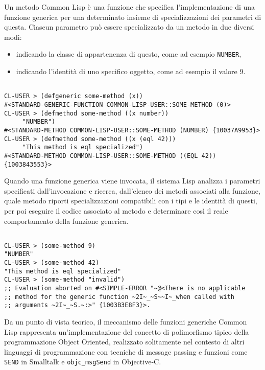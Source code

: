 Un metodo Common Lisp è una funzione che specifica l’implementazione di una
funzione generica per una determinato insieme di specializzazioni dei parametri
di questa. Ciascun parametro può essere specializzato da un metodo in due
diversi modi:

\begin{itemize}

\item indicando la classe di appartenenza di questo, come ad esempio
\texttt{NUMBER},

\item indicando l’identità di uno specifico oggetto, come ad esempio il valore
9.

\end{itemize}

\begin{lstlisting}[caption=Esempi definizione di metodi Common Lisp]

CL-USER > (defgeneric some-method (x))
#<STANDARD-GENERIC-FUNCTION COMMON-LISP-USER::SOME-METHOD (0)>
CL-USER > (defmethod some-method ((x number))
     "NUMBER")
#<STANDARD-METHOD COMMON-LISP-USER::SOME-METHOD (NUMBER) {10037A9953}>
CL-USER > (defmethod some-method ((x (eql 42)))
     "This method is eql specialized")
#<STANDARD-METHOD COMMON-LISP-USER::SOME-METHOD ((EQL 42)) {1003843553}>

\end{lstlisting}

Quando una funzione generica viene invocata, il sistema Lisp analizza i
parametri specificati dall'invocazione e ricerca, dall’elenco dei metodi
associati alla funzione, quale metodo riporti specializzazioni compatibili con i
tipi e le identità di questi, per poi eseguire il codice associato al metodo e
determinare così il reale comportamento della funzione generica.

\begin{lstlisting}[caption=Esempi di invocazione di metodi Common Lisp]

CL-USER > (some-method 9)
"NUMBER"
CL-USER > (some-method 42)
"This method is eql specialized"
CL-USER > (some-method "invalid")
;; Evaluation aborted on #<SIMPLE-ERROR "~@<There is no applicable
;; method for the generic function ~2I~_~S~~I~_when called with
;; arguments ~2I~_~S.~:>" {1003B3E8F3}>.

\end{lstlisting}

Da un punto di vista teorico, il meccanismo delle funzioni generiche Common Lisp
rappresenta un’implementazione del concetto di polimorfismo tipico della
programmazione Object Oriented, realizzato solitamente nel contesto di altri
linguaggi di programmazione con tecniche di message passing e funzioni come
\texttt{SEND} in Smalltalk e \texttt{objc\_msgSend} in Objective-C.\\

